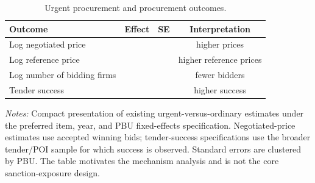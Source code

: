 \begin{table}[ht]
\centering
\caption{Urgent procurement and procurement outcomes.}
\label{tab:urgent_outcomes_v9}
\begin{threeparttable}
\begin{tabular}{lccc}
\toprule
Outcome & Effect & SE & Interpretation \\
\midrule
Log negotiated price & \BPnegCoef{} & \BPnegSE{} & \BPnegPctHeadline{} higher prices \\
Log reference price & \BPrefCoef{} & \BPrefSE{} & \BPrefPctPreferred{} higher reference prices \\
Log number of bidding firms & \BPfirmsCoef{} & \BPfirmsSE{} & \BPfirmsPctHeadlineAbs{} fewer bidders \\
Tender success & \BPsuccessCoef{} & \BPsuccessSE{} & \BPsuccessPP{} higher success \\
\bottomrule
\end{tabular}
\begin{tablenotes}[flushleft]\footnotesize
\item \textit{Notes:} Compact presentation of existing urgent-versus-ordinary estimates under the preferred item, year, and PBU fixed-effects specification. Negotiated-price estimates use accepted winning bids; tender-success specifications use the broader tender/POI sample for which success is observed. Standard errors are clustered by PBU. The table motivates the mechanism analysis and is not the core sanction-exposure design.
\end{tablenotes}
\end{threeparttable}
\end{table}
